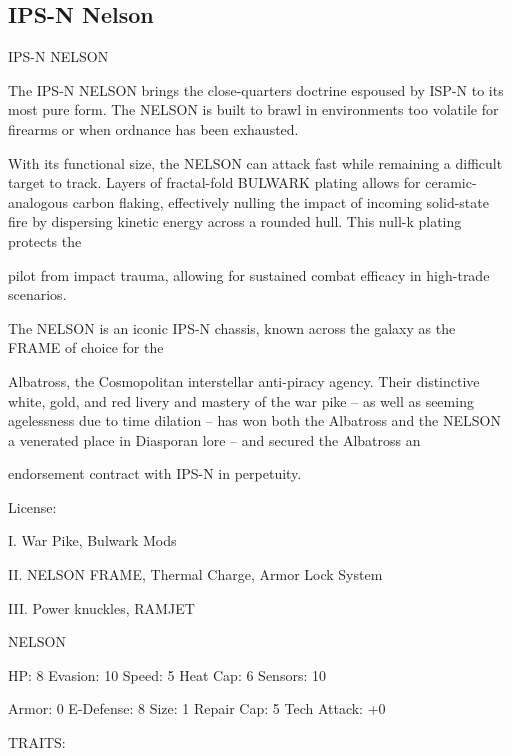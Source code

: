 \subsection{IPS-N Nelson}

                                              IPS-N NELSON  

The IPS-N NELSON brings the close-quarters doctrine espoused by ISP-N to its most pure form. The  
NELSON is built to brawl in environments too volatile for firearms or when ordnance has been exhausted.  

With its functional size, the NELSON can attack fast while remaining a difficult target to track. Layers of  
fractal-fold BULWARK plating allows for ceramic-analogous carbon flaking, effectively nulling the impact of  
incoming solid-state fire by dispersing kinetic energy across a rounded hull. This null-k plating protects the  

pilot from impact trauma, allowing for sustained combat efficacy in high-trade scenarios.   

The NELSON is an iconic IPS-N chassis, known across the galaxy as the FRAME of choice for the  

Albatross, the Cosmopolitan interstellar anti-piracy agency. Their distinctive white, gold, and red livery and  
mastery of the war pike -- as well as seeming agelessness due to time dilation -- has won both the  
Albatross and the NELSON a venerated place in Diasporan lore -- and secured the Albatross an  

endorsement contract with IPS-N in perpetuity.   

                                                     License:
 
I. War Pike, Bulwark Mods
 
II. NELSON FRAME, Thermal Charge, Armor Lock System
 
III. Power knuckles, RAMJET
 

                                                    NELSON 

  HP: 8           Evasion: 10                            Speed: 5            Heat Cap: 6        Sensors: 10 

  Armor: 0        E-Defense: 8                           Size: 1             Repair Cap: 5      Tech Attack:  
                                                                                                +0 

                                                     TRAITS: 

